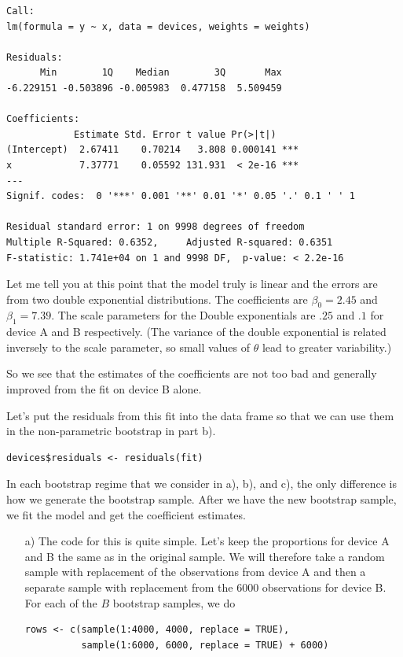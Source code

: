 \documentclass{article}
\begin{document}
\begin{description}
\begin{verbatim}
Call:
lm(formula = y ~ x, data = devices, weights = weights)

Residuals:
      Min        1Q    Median        3Q       Max 
-6.229151 -0.503896 -0.005983  0.477158  5.509459 

Coefficients:
            Estimate Std. Error t value Pr(>|t|)    
(Intercept)  2.67411    0.70214   3.808 0.000141 ***
x            7.37771    0.05592 131.931  < 2e-16 ***
---
Signif. codes:  0 '***' 0.001 '**' 0.01 '*' 0.05 '.' 0.1 ' ' 1 

Residual standard error: 1 on 9998 degrees of freedom
Multiple R-Squared: 0.6352,     Adjusted R-squared: 0.6351 
F-statistic: 1.741e+04 on 1 and 9998 DF,  p-value: < 2.2e-16 
\end{verbatim}

Let me tell you at this point that the model truly is linear and the
errors are from two double exponential distributions.  The
coefficients are $\beta_0 = 2.45$ and $\beta_1 = 7.39$.  The scale
parameters for the Double exponentials are $.25$ and $.1$ for device A
and B respectively.  (The variance of the double exponential is
related inversely to the scale parameter, so small values of $\theta$
lead to greater variability.)

So we see that the estimates of the coefficients are not too bad and
generally improved from the fit on device B alone.


Let's put the residuals from this fit into the data frame
so that we can use them in the non-parametric bootstrap in
part b).
\begin{verbatim}
devices$residuals <- residuals(fit)
\end{verbatim}


In each bootstrap regime that we consider in a), b), and c), the only
difference is how we generate the bootstrap sample.  After we have the
new bootstrap sample, we fit the model and get the coefficient
estimates.

\begin{enumerate}
\item[a)] The code for this is quite simple.  Let's keep the
  proportions for device A and B the same as in the original sample.
  We will therefore take a random sample with replacement of the
  observations from device A and then a separate sample with
  replacement from the $6000$ observations for device B.
For each of the $B$ bootstrap samples, we do
\begin{verbatim}
rows <- c(sample(1:4000, 4000, replace = TRUE),
          sample(1:6000, 6000, replace = TRUE) + 6000)


\end{verbatim}
\end{enumerate}
\end{description}
\end{document}
